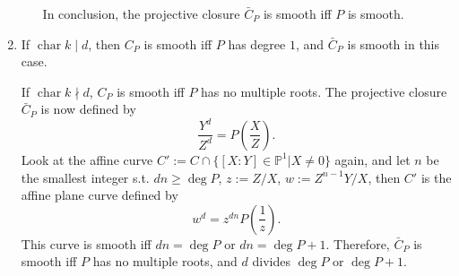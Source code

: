 \documentclass{article}
\theoremstyle{definition}
\theoremstyle{remark}
\renewcommand{\P}{\mathbb{P}}
\DeclareMathOperator{\cha}{char} %
\begin{document}
\begin{enumerate}
\begin{enumerate}
    In conclusion, the projective closure $\bar{C}_P$ is smooth iff $P$ is smooth.
    
\end{enumerate}


\item If $\cha k\mid d$, then $C_P$ is smooth iff $P$ has degree $1$, and $\bar{C}_P$ is smooth in this case.

If $\cha k \nmid d$, $C_P$ is smooth iff $P$ has no multiple roots.
The projective closure $\bar{C}_P$ is now defined by \[\frac{Y^d}{Z^d} = P\left( \frac{X}{Z} \right).\]
Look at the affine curve $C' := C\cap\{[X : Y]\in\P^1 | X \ne 0\}$ again, and let $n$ be the smallest integer s.t. $dn\ge \deg P$, $z := Z/X$, $w := Z^{n-1}Y/X$, then $C'$ is the affine plane curve defined by \[w^d = z^{dn}P\left( \frac{1}{z} \right).\]
This curve is smooth iff $dn = \deg P$ or $dn = \deg P + 1$. Therefore, $\bar{C}_P$ is smooth iff $P$ has no multiple roots, and $d$ divides $\deg P$ or $\deg P+1$.

\end{enumerate}
\end{document}

